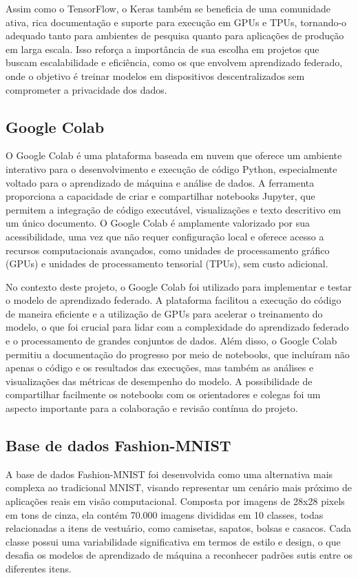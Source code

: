Assim como o TensorFlow, o Keras também se beneficia de uma comunidade ativa, rica documentação e suporte para execução em GPUs e TPUs, tornando-o adequado tanto para ambientes de pesquisa quanto para aplicações de produção em larga escala. Isso reforça a importância de sua escolha em projetos que buscam escalabilidade e eficiência, como os que envolvem aprendizado federado, onde o objetivo é treinar modelos em dispositivos descentralizados sem comprometer a privacidade dos dados.

\subsection{Google Colab}

O Google Colab é uma plataforma baseada em nuvem que oferece um ambiente interativo para o desenvolvimento e execução de código Python, especialmente voltado para o aprendizado de máquina e análise de dados. A ferramenta proporciona a capacidade de criar e compartilhar notebooks Jupyter, que permitem a integração de código executável, visualizações e texto descritivo em um único documento. O Google Colab é amplamente valorizado por sua acessibilidade, uma vez que não requer configuração local e oferece acesso a recursos computacionais avançados, como unidades de processamento gráfico (GPUs) e unidades de processamento tensorial (TPUs), sem custo adicional.

No contexto deste projeto, o Google Colab foi utilizado para implementar e testar o modelo de aprendizado federado. A plataforma facilitou a execução do código de maneira eficiente e a utilização de GPUs para acelerar o treinamento do modelo, o que foi crucial para lidar com a complexidade do aprendizado federado e o processamento de grandes conjuntos de dados. Além disso, o Google Colab permitiu a documentação do progresso por meio de notebooks, que incluíram não apenas o código e os resultados das execuções, mas também as análises e visualizações das métricas de desempenho do modelo. A possibilidade de compartilhar facilmente os notebooks com os orientadores e colegas foi um aspecto importante para a colaboração e revisão contínua do projeto.

\subsection{Base de dados Fashion-MNIST}

A base de dados Fashion-MNIST foi desenvolvida como uma alternativa mais complexa ao tradicional MNIST, visando representar um cenário mais próximo de aplicações reais em visão computacional. Composta por imagens de 28x28 pixels em tons de cinza, ela contém 70.000 imagens divididas em 10 classes, todas relacionadas a itens de vestuário, como camisetas, sapatos, bolsas e casacos. Cada classe possui uma variabilidade significativa em termos de estilo e design, o que desafia os modelos de aprendizado de máquina a reconhecer padrões sutis entre os diferentes itens.

